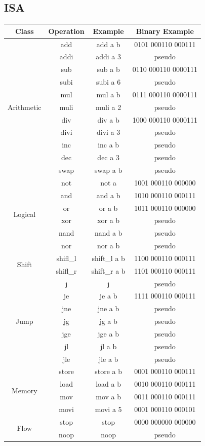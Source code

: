 \documentclass[12pt,a4paper]{scrartcl}
\begin{document}
\subsection{ISA}
\begin{tabular}{|c|c|c|c|}
\hline
Class & Operation & Example & Binary Example\\
\hline
\multirow{11}{*}{Arithmetic} & add & add a b & 0101 000110 000111 \\
& addi & addi a 3 & pseudo \\
& sub & sub a b & 0110 000110 0000111\\
& subi & subi a 6 & pseudo\\
& mul & mul a b & 0111 000110 0000111\\
& muli & muli a 2 & pseudo\\
& div & div a b & 1000 000110 0000111\\
& divi & divi a 3 & pseudo\\
& inc & inc a b & pseudo\\
& dec & dec a 3 & pseudo\\
& swap & swap a b & pseudo\\
\hline
\multirow{6}{*}{Logical} & not & not a & 1001 000110 000000\\
& and & and a b & 1010 000110 000111\\
& or & or a b & 1011 000110 000000\\
& xor & xor a b & pseudo\\
& nand & nand a b & pseudo\\
& nor & nor a b & pseudo\\
\hline
\multirow{2}{*}{Shift} & shifl\_l & shift\_l a b & 1100 000110 000111\\
& shifl\_r & shift\_r a b & 1101 000110 000111\\
\hline
\multirow{7}{*}{Jump} & j & j & pseudo \\
& je & je a b & 1111 000110 000111 \\
& jne & jne a b & pseudo \\
& jg & jg a b & pseudo \\
& jge & jge a b & pseudo \\
& jl & jl a b & pseudo \\
& jle & jle a b & pseudo \\
\hline
\multirow{4}{*}{Memory} & store & store a b & 0001 000110 000111\\
& load & load a b & 0010 000110 000111\\
& mov & mov a b & 0011 000110 000111\\
& movi & movi a 5 & 0001 000110 000101\\
\hline
\multirow{2}{*}{Flow} & stop & stop & 0000 000000 000000 \\
& noop & noop & pseudo \\
\hline
\end{tabular}
\end{document}
